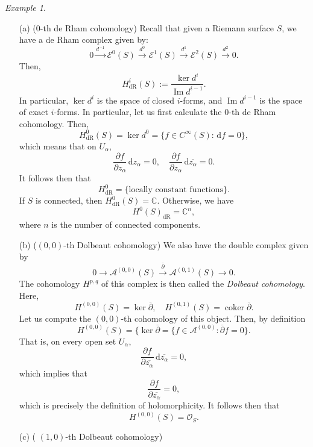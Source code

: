 \documentclass[a4paper]{report}
\theoremstyle{definition}
\theoremstyle{remark}
\theoremstyle{proposition}
\theoremstyle{conjecture}
\theoremstyle{lemma}
\theoremstyle{corollary}
\theoremstyle{exercise}
\theoremstyle{example}
\newtheorem{example}{Example}
\newcommand{\C}{\mathbb{C}}
\newcommand{\mcal}{\mathcal}
\newcommand{\diff}{\,\mathrm{d}}
\newcommand{\on}{\operatorname}
\begin{document}
\begin{example}
    \leavevmode
    \begin{itemize}
        \item[(a)] ($0$-th de Rham cohomology) Recall that given a Riemann surface $S$, we 
            have a de Rham complex given by:
            $$0\stackrel{d^{-1}}{\longrightarrow} \mcal{E}^0(S) \stackrel{d^0}{\longrightarrow} \mcal{E}^1(S) \stackrel{d^1}{\longrightarrow} \mcal{E}^2(S) \stackrel{d^2}{\longrightarrow} 0.$$
            Then, $$H_{\on{dR}}^i(S) := \frac{\ker d^i}{\on{Im}d^{i-1}}.$$
            In particular, $\ker d^i$ is the space of closed $i$-forms, and $\on{Im}d^{i-1}$ is the space 
            of exact $i$-forms.
            In particular, let us first calculate the $0$-th de Rham cohomology.
            Then, $$H^0_{\on{dR}} (S) = \ker d^0= \lbrace f\in C^\infty(S) : \diff f = 0\rbrace,$$
            which means that on $U_\alpha$, $$\frac{\partial f}{\partial z_\alpha}\diff z_\alpha = 0, \quad \frac{\partial f}{\partial z_\alpha}\diff \overline{z_\alpha}=0.$$
            It follows then that 
            $$H^0_{\on{dR}} = \lbrace \text{locally constant functions}\rbrace.$$
            If $S$ is connected, then $H^0_{\on{dR}}(S) = \C$.
            Otherwise, we have 
            $$H^0(S)_{\on{dR}} = \C^n,$$
            where $n$ is the number of connected components.
        \item[(b)] ($(0,0)$-th Dolbeaut cohomology) 
            We also have the double complex given by 
            $$0\longrightarrow \mcal{A}^{(0,0)}(S) \stackrel{\overline{\partial}}{\longrightarrow} \mcal{A}^{(0,1)}(S) \longrightarrow 0.$$
            The cohomology $H^{p,q}$ of this complex is then called 
            the \emph{Dolbeaut cohomology}.
            Here, $$H^{(0,0)}(S) = \ker\overline{\partial},\quad H^{(0,1)}(S) = \on{coker} \overline{\partial}.$$
            Let us compute the $(0,0)$-th cohomology of this object.
            Then, by definition
            $$H^{(0,0)}(S) = \lbrace \ker \overline{\partial}  =\lbrace f \in \mcal{A}^{(0,0)} : \overline{\partial}f=0\rbrace.$$
            That is, on every open set $U_\alpha$, 
            $$\frac{\partial f}{\partial \overline{z_\alpha}}\diff\overline{z_\alpha} = 0,$$
            which implies that 
            $$\frac{\partial f}{\partial \overline{z_\alpha}} = 0,$$
            which is precisely the definition of holomorphicity. It follows
            then that 
            $$H^{(0,0)}(S) = \mcal{O}_S.$$
        \item[(c)] ( $(1,0)$-th Dolbeaut cohomology) 

\end{itemize}
\end{example}
\end{document}

